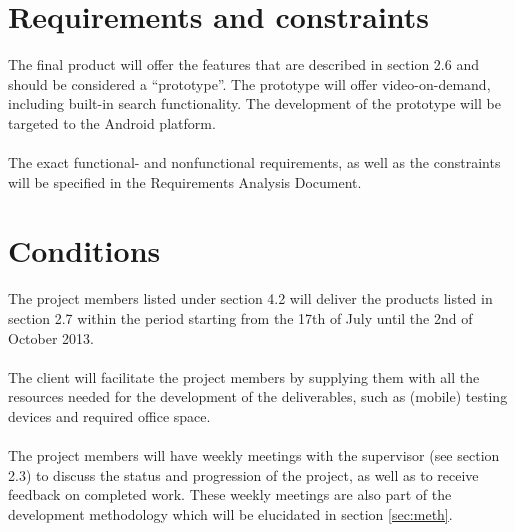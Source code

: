 \section{Requirements and constraints}
The final product will offer the features that are described in section 2.6 and should be considered a ``prototype''. The prototype will offer video-on-demand, including built-in search functionality. The development of the prototype will be targeted to the Android platform. \\
\\
The exact functional- and nonfunctional requirements, as well as the constraints will be specified in the Requirements Analysis Document.
\section{Conditions}
The project members listed under section 4.2 will deliver the products listed in section 2.7 within the period starting from the 17th of July until the 2nd of October 2013.\\
\\
The client will facilitate the project members by supplying them with all the resources needed for the development of the deliverables, such as (mobile) testing devices and required office space.\\
\\
The project members will have weekly meetings with the supervisor (see section 2.3) to discuss the status and progression of the project, as well as to receive feedback on completed work. These weekly meetings are also part of the development methodology which will be elucidated in section \ref{sec:meth}.